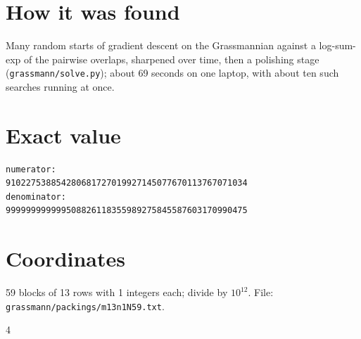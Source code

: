 \documentclass[11pt,a4paper]{article}
\begin{document}
\section{How it was found}
Many random starts of gradient descent on the Grassmannian against a log-sum-exp of the pairwise overlaps, sharpened over time, then a polishing stage (\texttt{grassmann/solve.py}); about 69 seconds on one laptop, with about ten such searches running at once.


\appendix
\section{Exact value}
{\small
\begin{verbatim}
numerator:
910227538854280681727019927145077670113767071034
denominator:
999999999999508826118355989275845587603170990475
\end{verbatim}}

\section{Coordinates}
59 blocks of 13 rows with 1 integers each; divide by $10^{12}$. File: \texttt{grassmann/packings/m13n1N59.txt}.
{\tiny
\begin{multicols}{4}
\end{multicols}}
\end{document}
